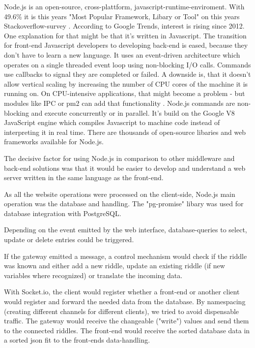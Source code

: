 Node.js is an open-source, cross-plattform, javascript-runtime-enviroment. 
With 49.6\% it is this years "Most Popular Framework, Libary or Tool" on this years Stackoverflow-survey \parencite{stackOverflowSurvey}.
According to Google Trends, interest is rising since 2012\parencite{gogleTrendNode}.
One explanation for that might be that it's written in Javascript. 
The transition for front-end Javascript developers to developing back-end is eased, because they don't have to learn a new language.
It uses an event-driven architecture which operates on a single threaded event loop using non-blocking I/O calls.
Commands use callbacks to signal they are completed or failed. 
A downside is, that it doesn't allow vertical scaling by increasing the number of CPU cores of the machine it is running on. 
On CPU-intensive applications, that might become a problem - but modules like IPC or pm2 can add that functionality \parencite{pm2}.
Node.js commands are non-blocking and execute concurrently or in parallel. 
It's build on the Google V8 JavaScript engine which compiles Javascript to machine code instead of interpreting it in real time. 
There are thousands of open-source libaries and web frameworks available for Node.js. 

The decisive factor for using Node.js in comparison to other middleware and back-end solutions was that it would be easier to develop and understand a web server written in the same language as the front-end.

As all the website operations were processed on the client-side, Node.js main operation was the database and handling.
The "pg-promise" libary \parencite{pg-promise} was used for database integration with PostgreSQL.

Depending on the event emitted by the web interface, database-queries to select, update or delete entries could be triggered.

If the gateway emitted a message, a control mechanism would check if the riddle was known and either add a new riddle, update an existing riddle (if new variables where recognized) or translate the incoming data.

With Socket.io, the client would register whether a front-end or another client would register and forward the needed data from the database.
By namespacing (creating different channels for different clients), we tried to avoid dispensable traffic.
The gateway would receive the changeable ("write") values and send them to the connected riddles.
The front-end would receive the sorted database data in a sorted json fit to the front-ends data-handling.

